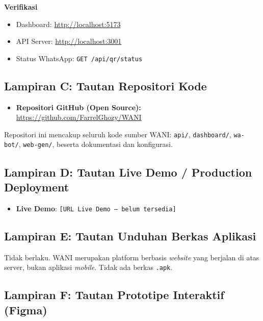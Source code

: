 \documentclass[12pt,a4paper,oneside]{article}
\begin{document}
\textbf{Verifikasi}
\begin{itemize}
	\item Dashboard: \url{http://localhost:5173}
	\item API Server: \url{http://localhost:3001}
	\item Status WhatsApp: \texttt{GET /api/qr/status}
\end{itemize}

\subsection*{Lampiran C: Tautan Repositori Kode}

\begin{itemize}
	\item \textbf{Repositori GitHub (Open Source):} \url{https://github.com/FarrelGhozy/WANI}
\end{itemize}

\noindent
Repositori ini mencakup seluruh kode sumber WANI: \texttt{api/}, \texttt{dashboard/}, \texttt{wa-bot/}, \texttt{web-gen/}, beserta dokumentasi dan konfigurasi.

\subsection*{Lampiran D: Tautan Live Demo / Production Deployment}

\begin{itemize}
	\item \textbf{Live Demo}: \texttt{[URL Live Demo -- belum tersedia]}
\end{itemize}

\subsection*{Lampiran E: Tautan Unduhan Berkas Aplikasi}

Tidak berlaku. WANI merupakan platform berbasis \textit{website} yang berjalan di atas server, bukan aplikasi \textit{mobile}. Tidak ada berkas \texttt{.apk}.

\subsection*{Lampiran F: Tautan Prototipe Interaktif (Figma)}
\end{document}

